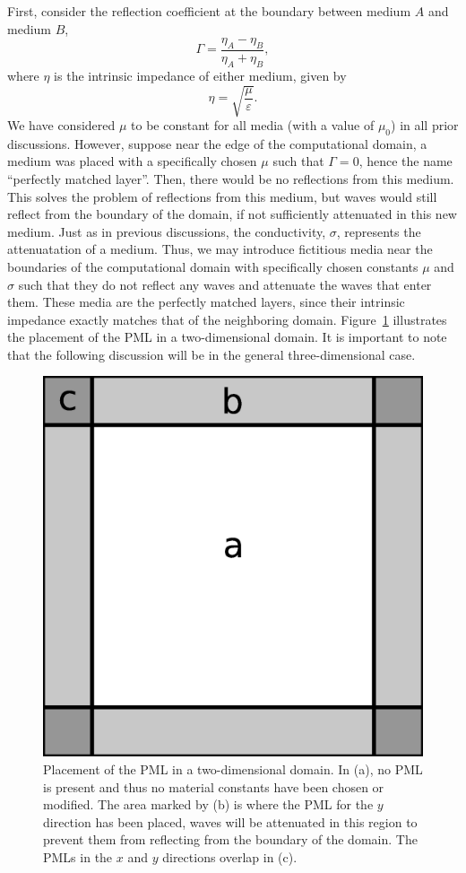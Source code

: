 \documentclass[12pt,twocolumn]{article}
\begin{document}
First, consider the reflection coefficient at the boundary between medium $A$ and medium $B$,
\begin{equation}
\Gamma = \frac{\eta_A-\eta_B}{\eta_A+\eta_B},
\end{equation}
where $\eta$ is the intrinsic impedance of either medium, given by
\begin{equation}
\eta=\sqrt{\frac{\mu}{\varepsilon}}.
\end{equation}
We have considered $\mu$ to be constant for all media (with a value of $\mu_0$) in all prior discussions. However, suppose near the edge of the computational domain, a medium was placed with a specifically chosen $\mu$ such that $\Gamma=0$, hence the name ``perfectly matched layer''. Then, there would be no reflections from this medium. This solves the problem of reflections from this medium, but waves would still reflect from the boundary of the domain, if not sufficiently attenuated in this new medium. Just as in previous discussions, the conductivity, $\sigma$, represents the attenuatation of a medium. Thus, we may introduce fictitious media near the boundaries of the computational domain with specifically chosen constants $\mu$ and $\sigma$ such that they do not reflect any waves and attenuate the waves that enter them. These media are the perfectly matched layers, since their intrinsic impedance exactly matches that of the neighboring domain. Figure~\ref{fig:PML} illustrates the placement of the PML in a two-dimensional domain. It is important to note that the following discussion will be in the general three-dimensional case.
\begin{figure}
\centering
\includegraphics[width=0.5\linewidth]{PML.eps}
\caption{Placement of the PML in a two-dimensional domain. In (a), no PML is present and thus no material constants have been chosen or modified. The area marked by (b) is where the PML for the $y$ direction has been placed, waves will be attenuated in this region to prevent them from reflecting from the boundary of the domain. The PMLs in the $x$ and $y$ directions overlap in (c).}
\label{fig:PML}
\end{figure}
\end{document}

